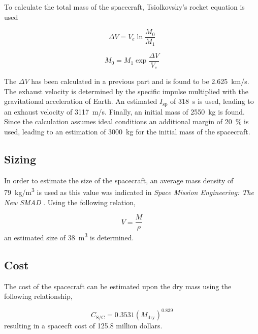 To calculate the total mass of the spacecraft, Tsiolkovsky's rocket
equation is used

\begin{equation}
  \Delta V = V_e \ln \frac{M_0}{M_1}
\end{equation}

\begin{equation}
  M_0 = M_1 \exp \frac{\Delta V}{V_e}
\end{equation}

The $\Delta V$ has been calculated in a previous part and is found to
be \SI{2.625}{km/s}. The exhaust velocity is determined by the
specific impulse multiplied with the gravitational acceleration of
Earth. An estimated $I_{\mathrm{sp}}$ of \SI{318}{s} is used, leading to an
exhaust velocity of \SI{3117}{m/s}. Finally, an initial mass of
\SI{2550}{kg} is found. Since the calculation assumes ideal conditions
an additional margin of \SI{20}{\%} is used, leading to an estimation
of \SI{3000}{kg} for the initial mass of the spacecraft.

\subsection{Sizing}

In order to estimate the size of the spacecraft, an average mass
density of \SI{79}{kg/m^3} is used as this value was indicated in
\textit{Space Mission Engineering: The New SMAD}
\cite{Wertz2011SpaceMissionEng}. Using the following relation,

\begin{equation}
  V = \frac{M}{\rho}
\end{equation}
an estimated size of \SI{38}{m^3} is determined.

\subsection{Cost}

The cost of the spacecraft can be estimated upon the dry mass using
the following relationship\cite{AE1201CourseReader},

\begin{equation}
  C_{\mathrm{S/C}} = 0.3531 (M_{\mathrm{dry}})^{0.839}
\end{equation}
resulting in a spacecft cost of 125.8 million dollars.


